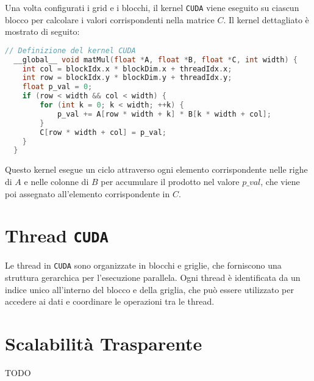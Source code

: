 Una volta configurati i grid e i blocchi, il kernel \texttt{CUDA} viene
eseguito su ciascun blocco per calcolare i valori corrispondenti nella
matrice \(C\). Il kernel dettagliato è mostrato di seguito:

\begin{lstlisting}[language=C]
  // Definizione del kernel CUDA
  __global__ void matMul(float *A, float *B, float *C, int width) {
    int col = blockIdx.x * blockDim.x + threadIdx.x;
    int row = blockIdx.y * blockDim.y + threadIdx.y;
    float p_val = 0;
    if (row < width && col < width) {
        for (int k = 0; k < width; ++k) {
            p_val += A[row * width + k] * B[k * width + col];
        }
        C[row * width + col] = p_val;
    }
  }
\end{lstlisting}

Questo kernel esegue un ciclo attraverso ogni elemento corrispondente
nelle righe di \(A\) e nelle colonne di \(B\) per accumulare il prodotto
nel valore \(p\_val\), che viene poi assegnato all'elemento corrispondente in \(C\).

\section{Thread \texttt{CUDA}}
Le thread in \texttt{CUDA} sono organizzate in blocchi e griglie, che
forniscono una struttura gerarchica per l'esecuzione parallela. Ogni
thread è identificata da un indice unico all'interno del blocco e della
griglia, che può essere utilizzato per accedere ai dati e coordinare
le operazioni tra le thread.

\section{Scalabilità Trasparente}
TODO

